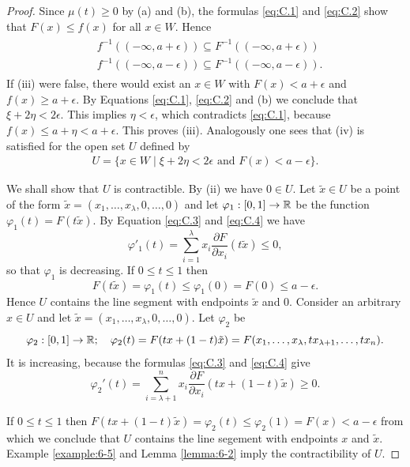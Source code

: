\begin{proof}
  Since $\mu(t)\ge 0$ by (a) and (b), the formulas \eqref{eq:C.1} and \eqref{eq:C.2} show that $F(x)\le f(x)$
  for all $x\in W$. Hence
  \begin{align}\label{eq:C.5}
  \begin{aligned}
    & f^{-1}((-\infty, a+\epsilon)) \subseteq F^{-1}((-\infty, a+\epsilon))\\
    & f^{-1}((-\infty, a-\epsilon)) \subseteq F^{-1}((-\infty, a-\epsilon)).
  \end{aligned}
  \end{align}
  If (iii) were false, there would exist an $x\in W$ with $F(x) < a+\epsilon$ and $f(x)\ge a+\epsilon$.
  By Equations \eqref{eq:C.1}, \eqref{eq:C.2} and (b) we conclude that $\xi+2\eta<2\epsilon$. This implies $\eta<\epsilon$,
  which contradicts \eqref{eq:C.1}, because $f(x)\le a+\eta<a+\epsilon$. This proves (iii). Analogously
  one sees that (iv) is satisfied for the open set $U$ defined by
  \begin{align}\label{eq:C.6}
    U = \{x\in W\mid \xi+2\eta<2\epsilon\text{ and } F(x) < a-\epsilon\}.
  \end{align}

  We shall show that $U$ is contractible. By (ii) we have $0\in U$. Let $\tilde{x}\in U$ be a point of the form 
  $\tilde{x} = (x_1, \ldots, x_\lambda, 0,\ldots, 0)$ and let $\varphi_1:[0, 1]\to{\ensuremath{\mathbb{R}}}$ be the function $\varphi_1(t)=F(t\tilde{x})$.
  By Equation \eqref{eq:C.3} and \eqref{eq:C.4} we have 
  \[
    \varphi'_1(t) = \sum_{i=1 }^{\lambda}{x_i \frac{\partial F }{\partial x_i }(t\tilde{x})}\le 0,
  \]
  so that $\varphi_1$ is decreasing. If $0\le t\le 1$ then 
  \[
    F(t\tilde{x}) = \varphi_1(t) \le \varphi_1(0) = F(0) \le a-\epsilon.
  \]
  Hence $U$ contains the line segment with endpoints $\tilde{x}$ and 0. Consider an arbitrary
  $x\in U$ and let $\tilde{x}= (x_1, \ldots, x_\lambda, 0,\ldots, 0)$. Let $\varphi_2$ be 
  \[
    \varphi_2:[0, 1]\to {\ensuremath{\mathbb{R}}}; \quad \varphi_2(t) = F(tx + (1-t)\tilde{x})
    = F(x_1, \ldots, x_\lambda, tx_{\lambda+1}, \ldots, tx_n).
  \]
  It is increasing, because the formulas \eqref{eq:C.3} and \eqref{eq:C.4} give
  \[
    \varphi_2'(t) = \sum_{i=\lambda+1}^{n }{x_i \frac{\partial F }{\partial x_i }(tx + (1-t)\tilde{x})}\ge 0.
  \]

  If $0\le t\le 1$ then $F(tx + (1-t)\tilde{x}) = \varphi_2(t)\le \varphi_2(1)=F(x)<a-\epsilon$ from 
  which we conclude that $U$ contains the line segement with endpoints $x$ and $\tilde{x}$. Example \ref{example:6-5}
  and Lemma \ref{lemma:6-2} imply the contractibility of $U$.


\end{proof}
